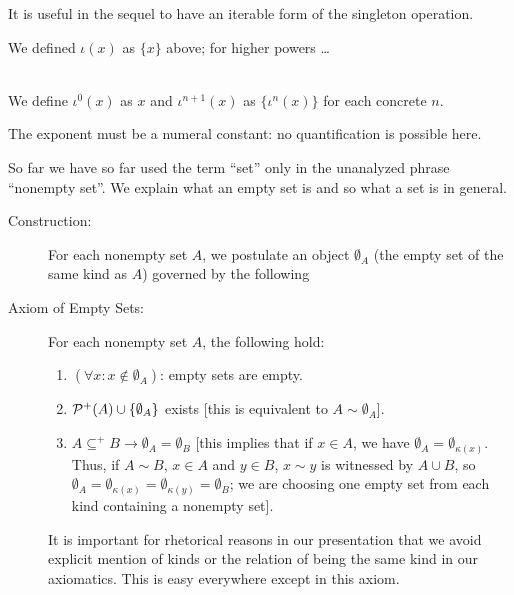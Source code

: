 \documentclass[12pt]{article}
\begin{document}
\endproof


It is useful in the sequel to have an iterable form of the singleton operation.

We defined $\iota(x)$ as $\{x\}$ above; for higher powers \ldots \begin{dfn}\mbox{\negthinspace}\\
  We define $\iota^0(x)$ as $x$ and $\iota^{n+1}(x)$ as $\{\iota^n(x)\}$ for each concrete $n$.\end{dfn} \begin{small}The exponent must be a numeral constant:  no quantification is possible here.\end{small}

\medskip


So far we have so far used the term ``set'' only in the unanalyzed phrase ``nonempty set''.  We explain what an empty set  is and so what a set is in general.

\begin{description}

\item[Construction:]  For each nonempty set $A$, we postulate an object $\emptyset_A$ (the empty set of the same kind as $A$) governed by the following

\item[Axiom of Empty Sets:]  For each nonempty set $A$, the following hold:

\begin{enumerate}

\item $(\forall x:x \not\in \emptyset_A)$:  empty sets are empty.

\item  ${\cal P}^+(A) \cup \{\emptyset_A\}$ exists [this is equivalent to $A \sim \emptyset_A$].

\item   $A \subseteq^+ B \rightarrow \emptyset_A = \emptyset_B$  [this implies that if $x \in A$, we have $\emptyset_A = \emptyset_{\kappa(x)}$.  Thus, if $A \sim B$, $x \in A$ and $y \in B$, $x \sim y$ is witnessed by $A \cup B$,
so $\emptyset_A = \emptyset_{\kappa(x)} = \emptyset_{\kappa(y)} = \emptyset_B$;  we are choosing one empty set from each kind containing a nonempty set].

\end{enumerate}

It is important for rhetorical reasons in our presentation that we avoid explicit mention of kinds or the relation of being the same kind in our axiomatics.  This is easy everywhere except in this axiom.
\end{description}
\end{document}
